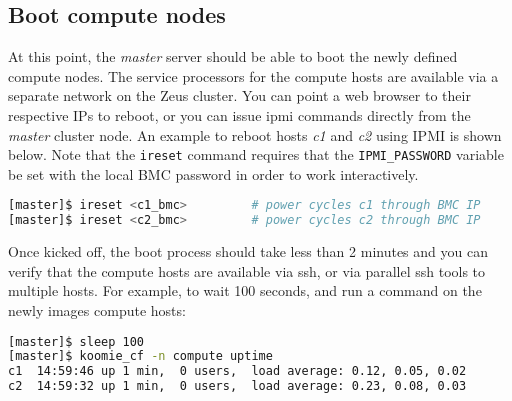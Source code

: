 \documentclass[letterpaper]{article}
\begin{document}


\subsection{Boot compute nodes}

At this point, the {\em master} server should be able to boot the newly defined
compute nodes.  The service processors for the compute hosts are available via
a separate network on the Zeus cluster. You can point a web browser to their
respective IPs to reboot, or you can issue ipmi commands directly from the {\em
  master} cluster node.  An example to reboot hosts {\em c1} and {\em c2} using
IPMI is shown below.  Note that the \texttt{ireset} command requires that the
\texttt{IPMI\_PASSWORD} variable be set with the local BMC password in order to
work interactively.

\vspace*{0.2cm}


\begin{lstlisting}[language=bash,keywords={},upquote=true]
[master]$ ireset <c1_bmc>         # power cycles c1 through BMC IP
[master]$ ireset <c2_bmc>         # power cycles c2 through BMC IP
\end{lstlisting} 


\vspace*{0.25cm}
Once kicked off, the boot process should take less than 2 minutes and you can
verify that the compute hosts are available via ssh, or via parallel ssh tools to multiple
hosts. For example, to wait 100 seconds, and run a command on the newly images
compute hosts:


\vspace*{0.2cm}
\begin{lstlisting}[language=bash]
[master]$ sleep 100
[master]$ koomie_cf -n compute uptime
c1  14:59:46 up 1 min,  0 users,  load average: 0.12, 0.05, 0.02
c2  14:59:32 up 1 min,  0 users,  load average: 0.23, 0.08, 0.03
\end{lstlisting}

\end{document}
